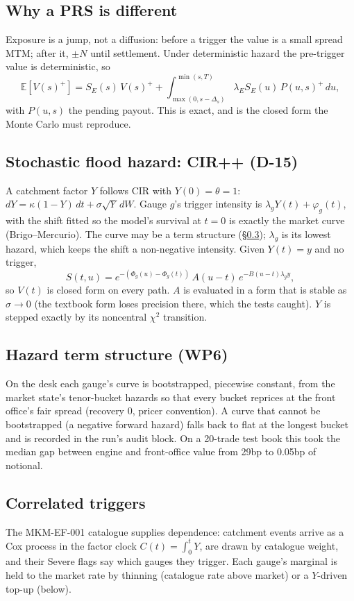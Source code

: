 \documentclass[11pt,a4paper]{article}
\begin{document}
\subsection{Why a PRS is different}
Exposure is a jump, not a diffusion: before a trigger the value is a small
spread MTM; after it, $\pm N$ until settlement. Under deterministic hazard the
pre-trigger value is deterministic, so
\begin{equation}
\mathbb{E}[V(s)^+] = S_E(s)\,V(s)^+ + \int_{\max(0,s-\Delta_s)}^{\min(s,T)} \lambda_E S_E(u)\, P(u,s)^+\,du,
\end{equation}
with $P(u,s)$ the pending payout. This is exact, and is the closed form the
Monte Carlo must reproduce.

\subsection{Stochastic flood hazard: CIR++ (D-15)}
A catchment factor $Y$ follows CIR with $Y(0)=\theta=1$:
$dY = \kappa(1-Y)\,dt + \sigma\sqrt{Y}\,dW$. Gauge $g$'s trigger intensity is
$\lambda_g Y(t) + \varphi_g(t)$, with the shift fitted so the model's survival
at $t=0$ is exactly the market curve (Brigo--Mercurio). The curve may be a term
structure (\S\ref{sec:ts}); $\lambda_g$ is its lowest hazard, which keeps the
shift a non-negative intensity. Given $Y(t)=y$ and no
trigger,
\begin{equation}
S(t,u) = e^{-(\Phi_g(u)-\Phi_g(t))}\,A(u-t)\,e^{-B(u-t)\lambda_g y},
\end{equation}
so $V(t)$ is closed form on every path. $A$ is evaluated in a form that is
stable as $\sigma\to0$ (the textbook form loses precision there, which the
tests caught). $Y$ is stepped exactly by its noncentral $\chi^2$ transition.

\subsection{Hazard term structure (WP6)}\label{sec:ts}
On the desk each gauge's curve is bootstrapped, piecewise constant, from the
market state's tenor-bucket hazards so that every bucket reprices at the front
office's fair spread (recovery 0, pricer convention). A curve that cannot be
bootstrapped (a negative forward hazard) falls back to flat at the longest
bucket and is recorded in the run's audit block. On a 20-trade test book this
took the median gap between engine and front-office value from 29bp to 0.05bp
of notional.

\subsection{Correlated triggers}
The MKM-EF-001 catalogue supplies dependence: catchment events arrive as a Cox
process in the factor clock $C(t)=\int_0^t Y$, are drawn by catalogue weight,
and their Severe flags say which gauges they trigger. Each gauge's marginal is
held to the market rate by thinning (catalogue rate above market) or a
$Y$-driven top-up (below).
\end{document}
